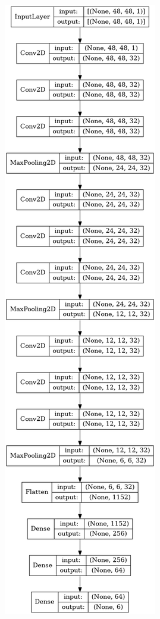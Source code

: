 \documentclass[12pt, a4paper]{scrbook}
\begin{document}
\begin{figure}[h]
\includegraphics[viewport=-14 150 300 1030]{Bilder/ModelSummary.png}
\end{figure}
\end{document}
